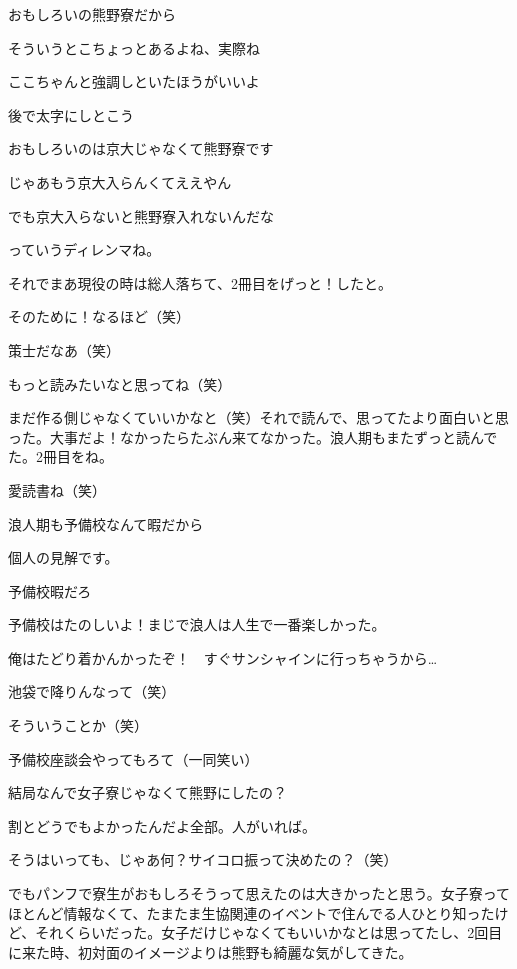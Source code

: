 \begin{multicols}{2}
  おもしろいの熊野寮だから

  そういうとこちょっとあるよね、実際ね

  ここちゃんと強調しといたほうがいいよ

  後で太字にしとこう

  おもしろいのは京大じゃなくて熊野寮です

  じゃあもう京大入らんくてええやん

  でも京大入らないと熊野寮入れないんだな

  っていうディレンマね。

  それでまあ現役の時は総人落ちて、2冊目をげっと！したと。

  そのために！なるほど（笑）

  策士だなあ（笑）

  もっと読みたいなと思ってね（笑）

  まだ作る側じゃなくていいかなと（笑）それで読んで、思ってたより面白いと思った。大事だよ！なかったらたぶん来てなかった。浪人期もまたずっと読んでた。2冊目をね。

  愛読書ね（笑）

  浪人期も予備校なんて暇だから

  個人の見解です。

  予備校暇だろ

  予備校はたのしいよ！まじで浪人は人生で一番楽しかった。

  俺はたどり着かんかったぞ！　すぐサンシャインに行っちゃうから…

  池袋で降りんなって（笑）

  そういうことか（笑）


  予備校座談会やってもろて（一同笑い）

  結局なんで女子寮じゃなくて熊野にしたの？

  割とどうでもよかったんだよ全部。人がいれば。

  そうはいっても、じゃあ何？サイコロ振って決めたの？（笑）

  でもパンフで寮生がおもしろそうって思えたのは大きかったと思う。女子寮ってほとんど情報なくて、たまたま生協関連のイベントで住んでる人ひとり知ったけど、それくらいだった。女子だけじゃなくてもいいかなとは思ってたし、2回目に来た時、初対面のイメージよりは熊野も綺麗な気がしてきた。


\end{multicols}
